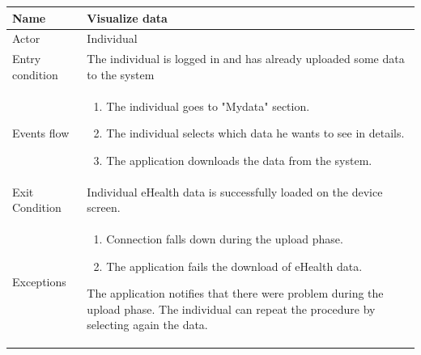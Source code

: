 \begin{table}[p]
\centering
\begin{tabular}{|l|p{11cm}|}
    \hline
    Name & Visualize data
    \\ \hline
    Actor & Individual
    \\ \hline 
    Entry condition & The individual is logged in and has already uploaded some data to the system
    \\ \hline
    Events flow &
    \begin{enumerate}
    \item The individual goes to "Mydata" section.
    \item The individual selects which data he wants to see in details.
    \item The application downloads the data from the system.
    \end{enumerate}
     \\ \hline
     Exit Condition & Individual eHealth data is successfully loaded on the device screen.
     \\
    \hline
    Exceptions &
    \begin{enumerate}
    \item Connection falls down during the upload phase.
    \item The application fails the download of eHealth data.
    \end{enumerate}
  The application notifies that there were problem during the upload phase. The individual can repeat the procedure by selecting again the data.
      \\
    \hline
\end{tabular}
\end{table}

